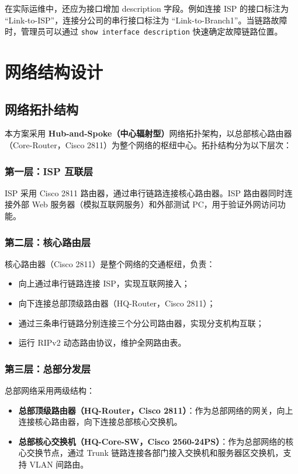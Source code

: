 \documentclass[12pt,a4paper]{ctexart}
\begin{document}
在实际运维中，还应为接口增加 description 字段。例如连接 ISP 的接口标注为 ``Link-to-ISP''，连接分公司的串行接口标注为 ``Link-to-Branch1''。当链路故障时，管理员可以通过 \texttt{show interface description} 快速确定故障链路位置。

\section{网络结构设计}

\subsection{网络拓扑结构}

本方案采用 \textbf{Hub-and-Spoke（中心辐射型）}网络拓扑架构，以总部核心路由器（Core-Router，Cisco 2811）为整个网络的枢纽中心。拓扑结构分为以下层次：

\subsubsection{第一层：ISP 互联层}

ISP 采用 Cisco 2811 路由器，通过串行链路连接核心路由器。ISP 路由器同时连接外部 Web 服务器（模拟互联网服务）和外部测试 PC，用于验证外网访问功能。

\subsubsection{第二层：核心路由层}

核心路由器（Cisco 2811）是整个网络的交通枢纽，负责：
\begin{itemize}
    \item 向上通过串行链路连接 ISP，实现互联网接入；
    \item 向下连接总部顶级路由器（HQ-Router，Cisco 2811）；
    \item 通过三条串行链路分别连接三个分公司路由器，实现分支机构互联；
    \item 运行 RIPv2 动态路由协议，维护全网路由表。
\end{itemize}

\subsubsection{第三层：总部分发层}

总部网络采用两级结构：
\begin{itemize}
    \item \textbf{总部顶级路由器（HQ-Router，Cisco 2811）}：作为总部网络的网关，向上连接核心路由器，向下连接总部核心交换机。
    \item \textbf{总部核心交换机（HQ-Core-SW，Cisco 2560-24PS）}：作为总部网络的核心交换节点，通过 Trunk 链路连接各部门接入交换机和服务器区交换机，支持 VLAN 间路由。
\end{itemize}
\end{document}
